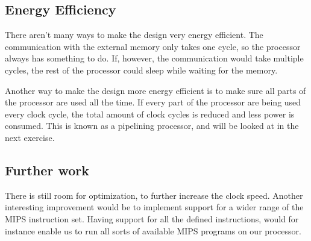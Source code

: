 \subsection{Energy Efficiency}
There aren't many ways to make the design very energy efficient.
The communication with the external memory only takes one cycle, so the processor always has something to do.
If, however, the communication would take multiple cycles, the rest of the processor could sleep while waiting for the memory.

Another way to make the design more energy efficient is to make sure all parts of the processor are used all the time.
If every part of the processor are being used every clock cycle,
the total amount of clock cycles is reduced and less power is consumed.
This is known as a pipelining processor, and will be looked at in the next exercise.

\subsection{Further work}

There is still room for optimization, to further increase the clock speed.
Another interesting improvement would be to implement support for a wider range of the MIPS instruction set.
Having support for all the defined instructions, would for instance enable us to run all sorts of available MIPS programs on our processor.

